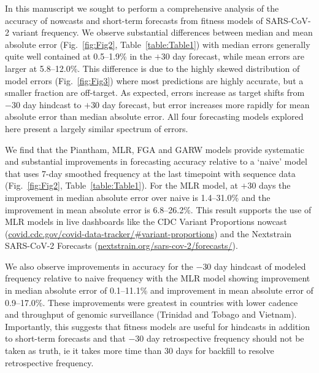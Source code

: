 \documentclass[10pt,letterpaper]{article}
\begin{document}
In this manuscript we sought to perform a comprehensive analysis of the accuracy of nowcasts and short-term forecasts from fitness models of SARS-CoV-2 variant frequency.
We observe substantial differences between median and mean absolute error (Fig.~\ref{fig:Fig2}, Table~\ref{table:Table1}) with median errors generally quite well contained at 0.5--1.9\% in the $+30$ day forecast, while mean errors are larger at 5.8--12.0\%.
This difference is due to the highly skewed distribution of model errors (Fig.~\ref{fig:Fig3}) where most predictions are highly accurate, but a smaller fraction are off-target.
As expected, errors increase as target shifts from $-30$ day hindcast to $+30$ day forecast, but error increases more rapidly for mean absolute error than median absolute error.
All four forecasting models explored here present a largely similar spectrum of errors.


\sloppy %
We find that the Piantham, MLR, FGA and GARW models provide systematic and substantial improvements in forecasting accuracy relative to a `naive' model that uses 7-day smoothed frequency at the last timepoint with sequence data (Fig.~\ref{fig:Fig2}, Table~\ref{table:Table1}).
For the MLR model, at $+30$ days the improvement in median absolute error over naive is 1.4--31.0\% and the improvement in mean absolute error is 6.8--26.2\%.
This result supports the use of MLR models in live dashboards like the CDC Variant Proportions nowcast (\href{https://covid.cdc.gov/covid-data-tracker/\#variant-proportions}{covid.cdc.gov/covid-data-tracker/\#variant-proportions}) and the Nextstrain SARS-CoV-2 Forecasts (\href{https://nextstrain.org/sars-cov-2/forecasts/}{nextstrain.org/sars-cov-2/forecasts/}).

We also observe improvements in accuracy for the $-30$ day hindcast of modeled frequency relative to naive frequency with the MLR model showing improvement in median absolute error of 0.1--11.1\% and improvement in mean absolute error of 0.9--17.0\%.
These improvements were greatest in countries with lower cadence and throughput of genomic surveillance (Trinidad and Tobago and Vietnam).
Importantly, this suggests that fitness models are useful for hindcasts in addition to short-term forecasts and that $-30$ day retrospective frequency should not be taken as truth, ie it takes more time than 30 days for backfill to resolve retrospective frequency.
\end{document}
